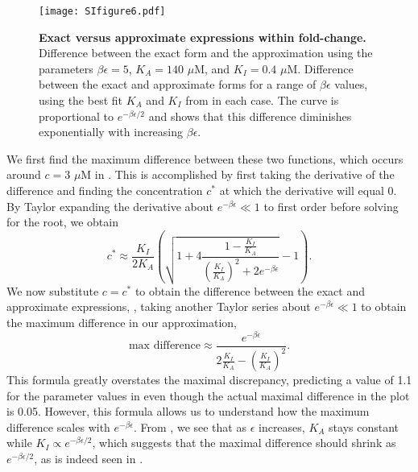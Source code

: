 \begin{figure}[h]
	\centering \texttt{[image: SIfigure6.pdf]} \caption{{\bf Exact versus
			approximate expressions within fold-change.}  Difference between
		the exact form \eref[eqSIstep2] and the approximation \eref[eqSIstep3] using
		the parameters $\beta \epsilon = 5$, $K_A = 140\,\,\mu\text{M}$, and $K_I =
		0.4\,\,\mu\text{M}$.  Difference between the exact and
		approximate forms for a range of $\beta \epsilon$ values, using the best fit
		$K_A$ and $K_I$ from \fref[SIfig5] in each case. The curve is
		proportional to $e^{-\beta \epsilon/2}$ and shows that this difference
		diminishes exponentially with increasing $\beta \epsilon$.} \label{SIfig6}
\end{figure}

We first find the maximum difference between these two functions, which occurs
around $c = 3\,\,\mu\text{M}$ in \fref[SIfig6]. This is accomplished by first
taking the derivative of the difference and finding the concentration $c^*$ at
which the derivative will equal 0. By Taylor expanding the derivative about
$e^{- \beta \epsilon} \ll 1$ to first order before solving for the root, we
obtain
\begin{equation}
c^* \approx \frac{K_I}{2 K_A} \left( \sqrt{1+4\frac{1-\frac{K_I}{K_A}}{\left( \frac{K_I}{K_A} \right)^2 + 2 e^{- \beta \epsilon}}} - 1 \right).
\end{equation}
We now substitute $c=c^*$ to obtain the difference between the exact
and approximate expressions, \eref[eqSIstep2][eqSIstep3], taking another Taylor
series about $e^{- \beta \epsilon} \ll 1$ to obtain the maximum difference in
our approximation,
\begin{equation}
\text{max difference} \approx \frac{e^{- \beta \epsilon}}{2 \frac{K_I}{K_A} - \left( \frac{K_I}{K_A} \right)^2}.
\end{equation}
This formula greatly overstates the maximal discrepancy, predicting a value of
1.1 for the parameter values in \fref[SIfig6] even though the actual
maximal difference in the plot is 0.05. However, this formula allows us to
understand how the maximum difference scales with $e^{- \beta \epsilon}$. From
\fref[SIfig5], we see that as $\epsilon$ increases, $K_A$ stays
constant while $K_I \propto e^{-\beta \epsilon/2}$, which suggests that the
maximal difference should shrink as $e^{-\beta \epsilon/2}$, as is indeed seen
in \fref[SIfig6].

\pagebreak
\phantom{...}
\pagebreak
